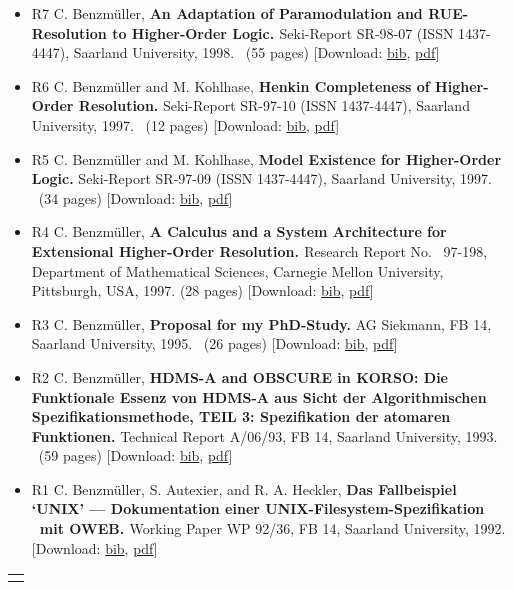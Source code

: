 \documentclass{article}
\newcommand{\tmtextbf}[1]{{\bfseries{#1}}}
\newcommand{\tmtextit}[1]{{\itshape{#1}}}
\newenvironment{itemizedot}{\begin{itemize} \renewcommand{\labelitemi}{$\bullet$}\renewcommand{\labelitemii}{$\bullet$}\renewcommand{\labelitemiii}{$\bullet$}\renewcommand{\labelitemiv}{$\bullet$}}{\end{itemize}}
\begin{document}
\begin{itemizedot}
  \item [R7] {\small C. Benzm\"uller, \tmtextbf{An Adaptation of
  Paramodulation and RUE-Resolution to Higher-Order Logic. }Seki-Report
  SR-98-07 (ISSN 1437-4447), Saarland University, 1998. \ (55 pages)}
  {\color{grey} [Download: {\small \href{../papers/R7.bib}{bib},
  \href{../papers/R7.pdf}{pdf}}]}
  
  \item [R6] {\small C. Benzm\"uller and M. Kohlhase, \tmtextbf{Henkin
  Completeness of Higher-Order Resolution.}} {\small Seki-Report SR-97-10
  (ISSN 1437-4447), Saarland University, 1997. \ (12 pages)} {\color{grey}
  [Download: {\small \href{../papers/R6.bib}{bib},
  \href{../papers/R6.pdf}{pdf}}]}
  
  \item [R5] {\small C. Benzm\"uller and M. Kohlhase, \tmtextbf{Model
  Existence for Higher-Order Logic.}} {\small Seki-Report SR-97-09 (ISSN
  1437-4447), Saarland University, 1997. \ (34 pages)} {\color{grey}
  [Download: {\small \href{../papers/R5.bib}{bib},
  \href{../papers/R5.pdf}{pdf}}]}
  
  \item [R4] {\small C. Benzm\"uller, \tmtextbf{A Calculus and a System
  Architecture for Extensional Higher-Order Resolution. }Research Report No. \
  97-198, Department of Mathematical Sciences, Carnegie Mellon University,
  Pittsburgh, USA, 1997. (28 pages)} {\color{grey} [Download: {\small
  \href{../papers/R4.bib}{bib}, \href{../papers/R4.pdf}{pdf}}]}
  
  \item [R3] {\small C. Benzm\"uller, \tmtextbf{Proposal for my PhD-Study.} AG
  Siekmann, FB 14, Saarland University, 1995. \ (26 pages)} {\color{grey}
  [Download: {\small \href{../papers/R3.bib}{bib},
  \href{../papers/R3.pdf}{pdf}}]}
  
  \item [R2] {\small C. Benzm\"uller, \tmtextbf{HDMS-A and OBSCURE in KORSO:
  Die Funktionale Essenz von HDMS-A aus Sicht der Algorithmischen
  Spezifikationsmethode, TEIL 3: Spezifikation der atomaren Funktionen.}
  Technical Report A/06/93, FB 14, Saarland University, 1993. \ (59 pages)}
  {\color{grey} [Download: {\small \href{../papers/R2.bib}{bib},
  \href{../papers/R2.pdf}{pdf}}]}
  
  \item [R1] {\small \tmtextit{}C. Benzm\"uller, S. Autexier, and R. A.
  Heckler, \tmtextbf{Das Fallbeispiel `UNIX' --- Dokumentation einer
  UNIX-Filesystem-Spezifikation \ mit OWEB. } Working Paper WP 92/36, FB 14,
  Saarland University, 1992. }{\color{grey} [Download: {\small
  \href{../papers/R1.bib}{bib}, \href{../papers/R1.pdf}{pdf}}]}
\end{itemizedot}
{\noindent}\begin{tabular}{l}
  \hline
  \quad
\end{tabular}
\end{document}
